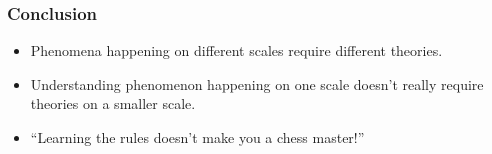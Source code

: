 \documentclass{beamer}
\begin{document}
\begin{frame}
\frametitle{Conclusion}

\begin{itemize}
    \item Phenomena happening on different scales require different theories.
    \item Understanding phenomenon happening on one scale 
    doesn't really require theories on a smaller scale.
    \item ``Learning the rules doesn't make you a chess master!''
\end{itemize}    

\end{frame}
\end{document}
